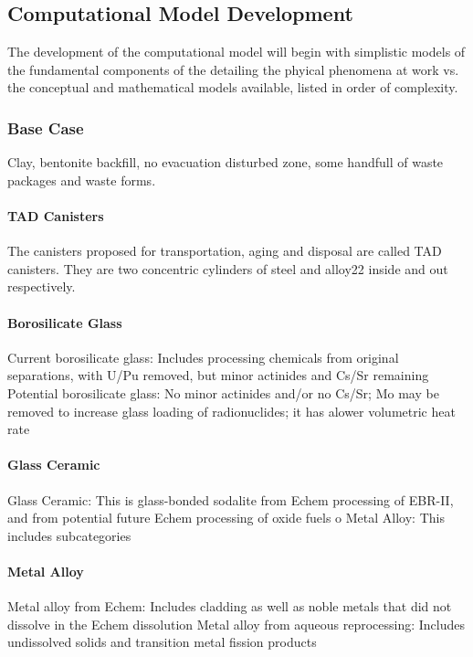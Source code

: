 \subsection{Computational Model Development}

The development of the computational model will begin with simplistic models of  
the fundamental components of the detailing the phyical phenomena at work vs.  
the conceptual and mathematical models available, listed in order of complexity.


\subsubsection{Base Case}

Clay, bentonite backfill, no evacuation disturbed zone, some handfull of waste 
packages and waste forms.




\paragraph{TAD Canisters} The canisters proposed for transportation, aging and 
disposal are called TAD canisters.  They are two concentric cylinders of steel 
and alloy22 inside and out respectively. 


\paragraph{Borosilicate Glass} Current borosilicate glass: Includes processing 
chemicals from original separations, with U/Pu removed, but minor actinides and 
Cs/Sr remaining Potential borosilicate glass: No minor actinides and/or no 
Cs/Sr; Mo may be removed to increase glass loading of radionuclides; it has 
alower volumetric heat rate


\paragraph{Glass Ceramic} Glass Ceramic:  This is glass-bonded sodalite from 
Echem processing of EBR-II, and from potential future Echem processing of oxide 
fuels o Metal Alloy: This includes subcategories


\paragraph{Metal Alloy} Metal alloy from Echem: Includes cladding as well as 
noble metals that did not dissolve in the Echem dissolution Metal alloy from 
aqueous reprocessing:  Includes undissolved solids and transition metal fission 
products


